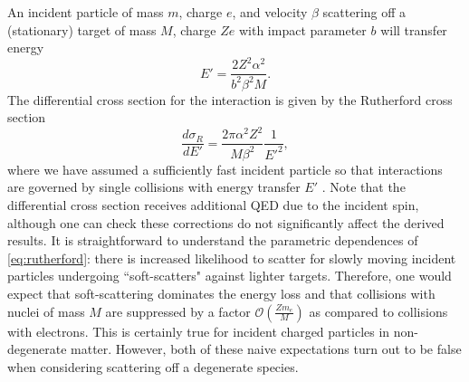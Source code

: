 \documentclass[twocolumn,showpacs,preprintnumbers,amsmath,amssymb,prd]{revtex4}
\newcommand{\OO}{\mathcal{O}}
\def\r{\right)}
\def\l{\left(}
\begin{document}
\begin{appendices}
An incident particle of mass $m$, charge $e$, and velocity $\beta$ scattering off a (stationary) target of mass $M$, charge $Ze$ with impact parameter $b$ will transfer energy
\begin{equation}
\label{eq:impact}
E' = \frac{2 Z^2 \alpha^2}{b^2 \beta ^2 M}.
\end{equation}
The differential cross section for the interaction is given by the Rutherford cross section
\begin{equation}
\label{eq:rutherford}
\frac{d \sigma_R}{dE'} = \frac{2 \pi  \alpha^2 Z^2}{M \beta^2} \frac{1}{E'^2},
 \end{equation}
where we have assumed a sufficiently fast incident particle so that interactions are governed by single collisions with energy transfer $E'$ \cite{Agashe:2014kda}.
 Note that the differential cross section receives additional QED due to the incident spin, although one can check these corrections do not significantly affect the derived results.
It is straightforward to understand the parametric dependences of \eqref{eq:rutherford}: there is increased likelihood to scatter for slowly moving incident particles undergoing ``soft-scatters" against lighter targets.
Therefore, one would expect that soft-scattering dominates the energy loss and that collisions with nuclei of mass $M$ are suppressed by a factor $\OO\l\frac{Z m_e}{M}\r$ as compared to collisions with electrons.
This is certainly true for incident charged particles in non-degenerate matter.
However, both of these naive expectations turn out to be false when considering scattering off a degenerate species.


\end{appendices}
\end{document}
